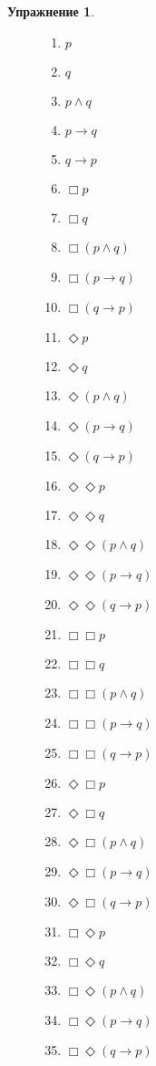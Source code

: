 \documentclass[11pt]{article}
\newtheorem{exercise}[theorem]{Упражнение}
\begin{document}
\begin{exercise}
\begin{figure}[hbt]
\begin{multicols}{4}
\begin{enumerate}
\item $p$
\item $q$
\item $p \wedge q$
\item $p \to q$
\item $q \to p$
\item $\Box p$
\item $\Box q$
\item $\Box (p \wedge q)$ 
\item $\Box (p \to q)$ 
\item $\Box (q \to p)$ 
\item $\Diamond p$
\item $\Diamond  q$
\item $\Diamond (p \wedge q)$ 
\item $\Diamond (p \to q)$ 
\item $\Diamond (q \to p)$ 
\item $\Diamond \Diamond p$
\item $\Diamond  \Diamond q$
\item $\Diamond \Diamond (p \wedge q)$ 
\item $\Diamond \Diamond (p \to q)$ 
\item $\Diamond \Diamond (q \to p)$ 
\item $\Box  \Box  p$
\item $\Box  \Box  q$
\item $ \Box  \Box  (p \wedge q)$ 
\item $ \Box  \Box (p \to q)$ 
\item $ \Box  \Box (q \to p)$ 
\item $\Diamond   \Box  p$
\item $\Diamond   \Box  q$
\item $ \Diamond  \Box  (p \wedge q)$ 
\item $ \Diamond  \Box (p \to q)$ 
\item $ \Diamond  \Box (q \to p)$ 
\item $\Box  \Diamond  p$
\item $\Box \Diamond  q$
\item $ \Box  \Diamond  (p \wedge q)$ 
\item $ \Box  \Diamond (p \to q)$ 
\item $ \Box  \Diamond (q \to p)$ 
\end{enumerate}
\end{multicols}
\end{figure}
\end{exercise}
\end{document}
